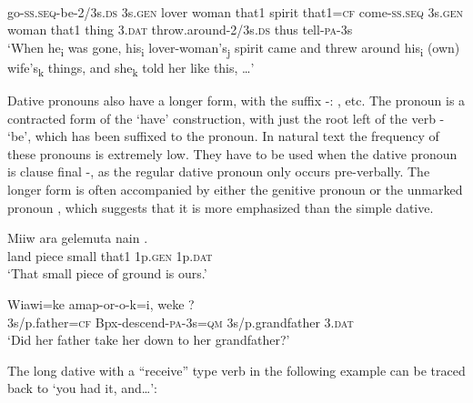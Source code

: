 \ea%
\label{ex:3:x1318}
\\
go-\textsc{ss}.\textsc{seq}-be-2/3s.\textsc{ds} 3s.\textsc{gen} lover woman that1 spirit that1=\textsc{cf} come-\textsc{ss}.\textsc{seq} 3s.\textsc{gen} woman that1 thing 3.\textsc{dat} throw.around-2/3s.\textsc{ds} thus tell-\textsc{pa}-3s\\
\glt`When he\textsubscript{i} was gone, his\textsubscript{i} lover-woman's\textsubscript{j} spirit came and threw around his\textsubscript{i} (own) wife's\textsubscript{k} things, and she\textsubscript{k} told her like this, {\dots}'
\z

Dative pronouns also have a longer form, with the suffix -: ,  etc. The pronoun is a contracted form of the `have' construction, with just the root left of the verb - `be', which has been suffixed to the pronoun. In natural text the frequency of these pronouns is extremely low. They have to be used when the dative pronoun is clause final -, as the regular dative pronoun only occurs pre-verbally. The longer form is often accompanied by either the genitive pronoun  or the unmarked pronoun , which suggests that it is more emphasized than the simple dative.

\ea%
\label{ex:3:x597}
\gll Miiw ara gelemuta nain  . \\
land piece small that1 1p.\textsc{gen} 1p.\textsc{dat}\\
\glt`That small piece of ground is ours.'
\z

\ea%
\label{ex:3:x598}
\gll Wiawi=ke amap-or-o-k=i, weke ? \\
3s/p.father=\textsc{cf} Bpx-descend-\textsc{pa}-3s=\textsc{qm} 3s/p.grandfather 3.\textsc{dat}\\
\glt`Did her father take her down to her grandfather?'
\z

The long dative with a ``receive'' type verb in the following example can be traced back to  `you had it, and{\dots}':

